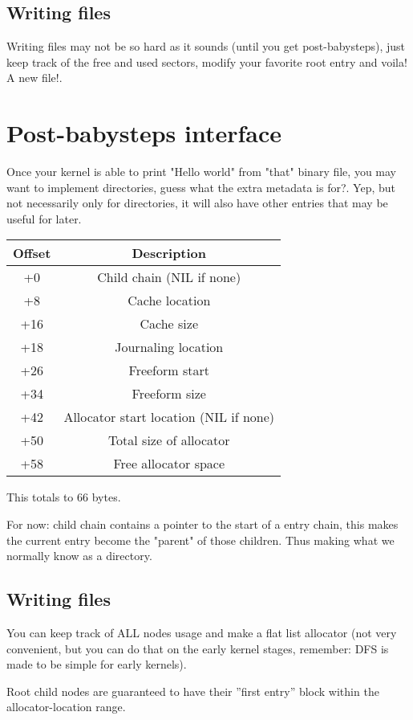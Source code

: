 \documentclass[12pt]{article}
\begin{document}
\subsection{Writing files}
Writing files may not be so hard as it sounds (until you get post-babysteps), just keep track of the free and used sectors, modify your favorite root entry and voila! A new file!.

\section{Post-babysteps interface}
Once your kernel is able to print "Hello world" from "that" binary file, you may want to implement directories, guess what the extra metadata is for?. Yep, but not necessarily only for directories, it will also have other entries that may be useful for later.

\begin{center}
\begin{tabular}{ |c|c| }
\hline
Offset & Description \\
\hline
+0 & Child chain (NIL if none) \\
+8 & Cache location \\
+16 & Cache size \\
+18 & Journaling location \\
+26 & Freeform start \\
+34 & Freeform size \\
+42 & Allocator start location (NIL if none) \\
+50 & Total size of allocator \\
+58 & Free allocator space \\
\hline
\end{tabular}
\end{center}

This totals to 66 bytes.

For now: child chain contains a pointer to the start of a entry chain, this makes the current entry become the "parent" of those children. Thus making what we normally know as a directory.

\subsection{Writing files}
You can keep track of ALL nodes usage and make a flat list allocator (not very convenient, but you can do that on the early kernel stages, remember: DFS is made to be simple for early kernels).

Root child nodes are guaranteed to have their ''first entry'' block within the allocator-location range.
\end{document}
